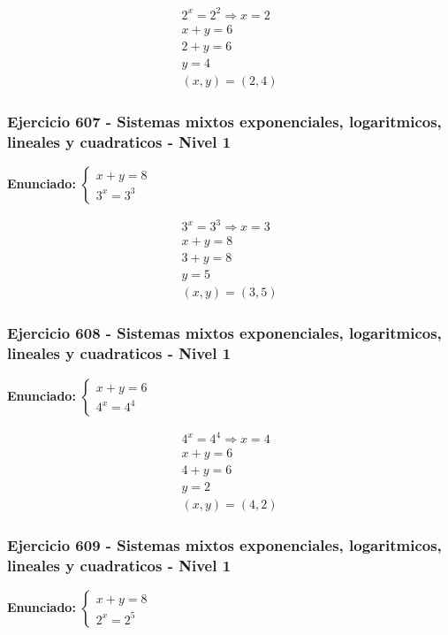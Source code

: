 \documentclass[12pt,a4paper]{article}
\begin{document}
\[
\begin{aligned}
2^x=2^{2}\Rightarrow x=2\\
x+y=6\\
2+y=6\\
y=4\\
\boxed{(x,y)=(2,4)}
\end{aligned}
\]


\subsubsection*{Ejercicio 607 - Sistemas mixtos exponenciales, logaritmicos, lineales y cuadraticos - Nivel 1}
\textbf{Enunciado:} \(\begin{cases} x+y=8\\ 3^x=3^{3}\end{cases}\)

\[
\begin{aligned}
3^x=3^{3}\Rightarrow x=3\\
x+y=8\\
3+y=8\\
y=5\\
\boxed{(x,y)=(3,5)}
\end{aligned}
\]


\subsubsection*{Ejercicio 608 - Sistemas mixtos exponenciales, logaritmicos, lineales y cuadraticos - Nivel 1}
\textbf{Enunciado:} \(\begin{cases} x+y=6\\ 4^x=4^{4}\end{cases}\)

\[
\begin{aligned}
4^x=4^{4}\Rightarrow x=4\\
x+y=6\\
4+y=6\\
y=2\\
\boxed{(x,y)=(4,2)}
\end{aligned}
\]


\subsubsection*{Ejercicio 609 - Sistemas mixtos exponenciales, logaritmicos, lineales y cuadraticos - Nivel 1}
\textbf{Enunciado:} \(\begin{cases} x+y=8\\ 2^x=2^{5}\end{cases}\)
\end{document}
